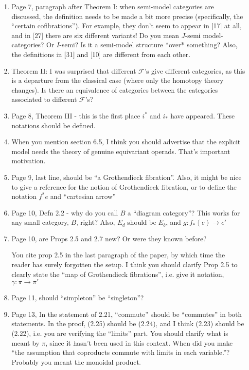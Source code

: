 \documentclass{article}
\begin{document}
\begin{enumerate}
\item
Page 7, paragraph after Theorem I: when semi-model categories are discussed, the definition needs to be made a bit more precise (specifically, the ``certain cofibrations''). For example, they don't seem to appear in [17] at all, and in [27] there are six different variants! Do you mean $J$-semi model-categories? Or $I$-semi? Is it a semi-model structure *over* something? Also, the definitions in [31] and [10] are different from each other.

\item
Theorem II: I was surprised that different $\mathcal{F}$'s give different categories, as this is a departure from the classical case (where only the homotopy theory changes). Is there an equivalence of categories between the categories associated to different $\mathcal{F}$'s?

\item
Page 8, Theorem III - this is the first place $i^*$ and $i_*$ have appeared. These notations should be defined.

\item
When you mention section 6.5, I think you should advertise that the explicit model needs the theory of genuine equivariant operads. That's important motivation.

\item
Page 9, last line, should be ``a Grothendieck fibration''. Also, it might be nice to give a reference for the notion of Grothendieck fibration, or to define the notation $f^*e$ and ``cartesian arrow''

\item
Page 10, Defn 2.2 - why do you call $B$ a ``diagram category''? This works for any small category, $B$, right? Also, $E_d$ should be $E_b$, and $g: f_*(e) \to e'$

\item
Page 10, are Props 2.5 and 2.7 new? Or were they known before?

You cite prop 2.5 in the last paragraph of the paper, by which time the reader has surely forgotten the setup. I think you should clarify Prop 2.5 to clearly state the ``map of Grothendieck fibrations'', i.e. give it notation, $\gamma \colon \pi \to \pi'$

\item
Page 11, should ``simpleton'' be ``singleton''?



\item
Page 13, In the statement of 2.21, ``commute'' should be ``commutes'' in both statements.
In the proof, (2.25) should be (2.24), and I think (2.23) should be (2.22), i.e. you are verifying the ``limits'' part. 
You should clarify what is meant by $\pi$, since it hasn't been used in this context.
When did you make ``the assumption that coproducts commute with limits in each variable.''? Probably you meant the monoidal product.


\end{enumerate}
\end{document}
